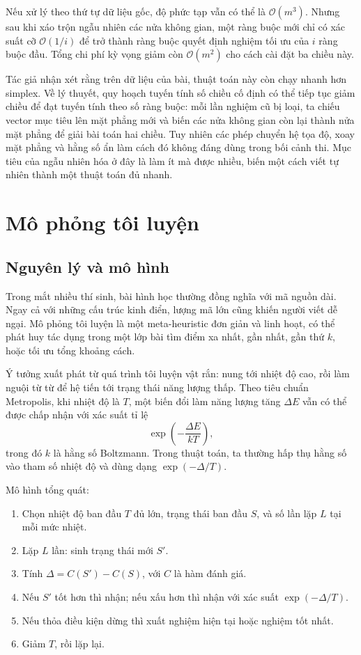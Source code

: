 \documentclass[11pt]{article}
\newcommand{\Oh}{\mathcal{O}}
\begin{document}
Nếu xử lý theo thứ tự dữ liệu gốc, độ phức tạp vẫn có thể là \(\Oh(m^3)\).
Nhưng sau khi xáo trộn ngẫu nhiên các nửa không gian, một ràng buộc mới chỉ
có xác suất cỡ \(\Oh(1/i)\) để trở thành ràng buộc quyết định nghiệm tối ưu
của \(i\) ràng buộc đầu. Tổng chi phí kỳ vọng giảm còn \(\Oh(m^2)\) cho cách
cài đặt ba chiều này.

Tác giả nhận xét rằng trên dữ liệu của bài, thuật toán này còn chạy nhanh hơn
simplex. Về lý thuyết, quy hoạch tuyến tính số chiều cố định có thể tiếp tục
giảm chiều để đạt tuyến tính theo số ràng buộc: mỗi lần nghiệm cũ bị loại, ta
chiếu vector mục tiêu lên mặt phẳng mới và biến các nửa không gian còn lại
thành nửa mặt phẳng để giải bài toán hai chiều. Tuy nhiên các phép chuyển hệ
tọa độ, xoay mặt phẳng và hằng số ẩn làm cách đó không đáng dùng trong bối
cảnh thi. Mục tiêu của ngẫu nhiên hóa ở đây là làm ít mà được nhiều, biến một
cách viết tự nhiên thành một thuật toán đủ nhanh.

\section{Mô phỏng tôi luyện}

\subsection{Nguyên lý và mô hình}

Trong mắt nhiều thí sinh, bài hình học thường đồng nghĩa với mã nguồn dài.
Ngay cả với những cấu trúc kinh điển, lượng mã lớn cũng khiến người viết dễ
ngại. Mô phỏng tôi luyện là một meta-heuristic đơn giản và linh hoạt, có thể
phát huy tác dụng trong một lớp bài tìm điểm xa nhất, gần nhất, gần thứ \(k\),
hoặc tối ưu tổng khoảng cách.

Ý tưởng xuất phát từ quá trình tôi luyện vật rắn: nung tới nhiệt độ cao, rồi
làm nguội từ từ để hệ tiến tới trạng thái năng lượng thấp. Theo tiêu chuẩn
Metropolis, khi nhiệt độ là \(T\), một biến đổi làm năng lượng tăng \(\Delta E\)
vẫn có thể được chấp nhận với xác suất tỉ lệ
\[
  \exp\!\left(-\frac{\Delta E}{kT}\right),
\]
trong đó \(k\) là hằng số Boltzmann. Trong thuật toán, ta thường hấp thụ hằng
số vào tham số nhiệt độ và dùng dạng \(\exp(-\Delta/T)\).

Mô hình tổng quát:
\begin{enumerate}
  \item Chọn nhiệt độ ban đầu \(T\) đủ lớn, trạng thái ban đầu \(S\), và số
  lần lặp \(L\) tại mỗi mức nhiệt.
  \item Lặp \(L\) lần: sinh trạng thái mới \(S'\).
  \item Tính \(\Delta=C(S')-C(S)\), với \(C\) là hàm đánh giá.
  \item Nếu \(S'\) tốt hơn thì nhận; nếu xấu hơn thì nhận với xác suất
  \(\exp(-\Delta/T)\).
  \item Nếu thỏa điều kiện dừng thì xuất nghiệm hiện tại hoặc nghiệm tốt nhất.
  \item Giảm \(T\), rồi lặp lại.
\end{enumerate}
\end{document}
